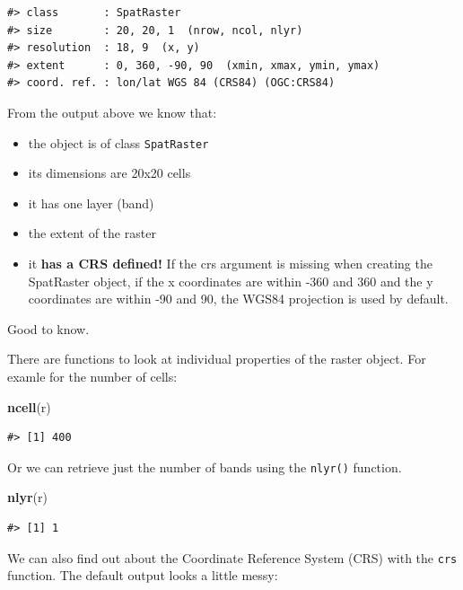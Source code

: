 \documentclass[
]{book}
\newenvironment{Shaded}{\begin{snugshade}}{\end{snugshade}}
\newcommand{\FunctionTok}[1]{\textcolor[rgb]{0.13,0.29,0.53}{\textbf{#1}}}
\newcommand{\NormalTok}[1]{#1}
\providecommand{\tightlist}{%
  \setlength{\itemsep}{0pt}\setlength{\parskip}{0pt}}
\begin{document}
\begin{verbatim}
#> class       : SpatRaster 
#> size        : 20, 20, 1  (nrow, ncol, nlyr)
#> resolution  : 18, 9  (x, y)
#> extent      : 0, 360, -90, 90  (xmin, xmax, ymin, ymax)
#> coord. ref. : lon/lat WGS 84 (CRS84) (OGC:CRS84)
\end{verbatim}

From the output above we know that:

\begin{itemize}
\tightlist
\item
  the object is of class \texttt{SpatRaster}
\item
  its dimensions are 20x20 cells
\item
  it has one layer (band)
\item
  the extent of the raster
\item
  it \textbf{has a CRS defined!} If the crs argument is missing when creating the SpatRaster object, if the x coordinates are within -360 and 360 and the y coordinates are within -90 and 90, the WGS84 projection is used by default.
\end{itemize}

Good to know.

There are functions to look at individual properties of the raster object. For examle for the number of cells:

\begin{Shaded}
\begin{Highlighting}[]
\FunctionTok{ncell}\NormalTok{(r)}
\end{Highlighting}
\end{Shaded}

\begin{verbatim}
#> [1] 400
\end{verbatim}

Or we can retrieve just the number of bands using the \texttt{nlyr()} function.

\begin{Shaded}
\begin{Highlighting}[]
\FunctionTok{nlyr}\NormalTok{(r)}
\end{Highlighting}
\end{Shaded}

\begin{verbatim}
#> [1] 1
\end{verbatim}

We can also find out about the Coordinate Reference System (CRS) with the \texttt{crs} function. The default output looks a little messy:
\end{document}
